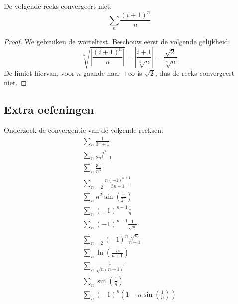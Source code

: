 \documentclass[main.tex]{subfiles}
\begin{document}
\begin{vb}
  De volgende reeks convergeert niet:
  \[ \sum_{n}\frac{(i+1)^{n}}{n} \]

  \begin{proof}
    We gebruiken de worteltest.
    Beschouw eerst de volgende gelijkheid:
    \[ \sqrt[n]{\left| \frac{(i+1)^{n}}{n} \right|} = \left| \frac{i+1}{\sqrt[n]{n}} \right| = \frac{\sqrt{2}}{\sqrt[n]{n}} \]
    De limiet hiervan, voor $n$ gaande naar $+\infty$ is $\sqrt{2}$, dus de reeks convergeert niet.
  \end{proof}
\end{vb}

\subsection{Extra oefeningen}
\label{sec:extra-oefeningen}

Onderzoek de convergentie van de volgende reeksen:
\begin{align}
  \sum_{n}\frac{1}{3^{n}+1}\\
  \sum_{n}\frac{n^{2}}{2n^{3}-1}\\
  \sum_{n}\frac{3^{n}}{n^{3}}\\
  \sum_{n=2}\frac{n(-1)^{n+1}}{3n-1}\\
  \sum_{n} n^{2}\sin\left(\frac{\pi}{2^{n}}\right)\\
  \sum_{n} (-1)^{n-1}\frac{1}{n}\\
  \sum_{n} (-1)^{n-1}\frac{1}{\sqrt{n}}\\
  \sum_{n=2} (-1)^{n}\frac{\sqrt{n}}{n+1}\\
  \sum_{n} \ln\left(\frac{n}{n+1}\right)\\
  \sum_{n} \frac{1}{\sqrt{n(n+1)}}\\
  \sum_{n} \sin\left(\frac{1}{n}\right)\\
  \sum_{n} (-1)^{n} \left( 1 - n\sin\left(\frac{1}{n}\right)\right)
\end{align}
\end{document}
